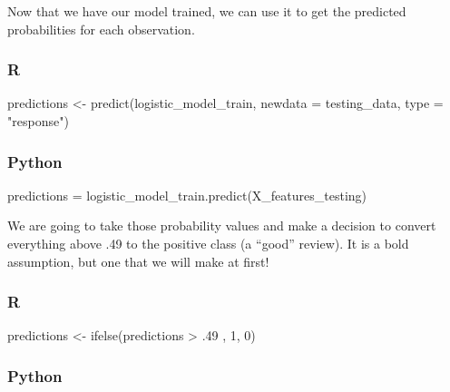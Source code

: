 \documentclass[
  letterpaper,
]{krantz}
\newenvironment{Shaded}{}{}
\newcommand{\AttributeTok}[1]{\textcolor[rgb]{0.49,0.56,0.16}{#1}}
\newcommand{\DecValTok}[1]{\textcolor[rgb]{0.25,0.63,0.44}{#1}}
\newcommand{\FunctionTok}[1]{\textcolor[rgb]{0.02,0.16,0.49}{#1}}
\newcommand{\NormalTok}[1]{#1}
\newcommand{\OperatorTok}[1]{\textcolor[rgb]{0.40,0.40,0.40}{#1}}
\newcommand{\OtherTok}[1]{\textcolor[rgb]{0.00,0.44,0.13}{#1}}
\newcommand{\SpecialCharTok}[1]{\textcolor[rgb]{0.25,0.44,0.63}{#1}}
\newcommand{\StringTok}[1]{\textcolor[rgb]{0.25,0.44,0.63}{#1}}
\begin{document}
Now that we have our model trained, we can use it to get the predicted
probabilities for each observation.

\subsubsection{R}

\begin{Shaded}
\begin{Highlighting}[]
\NormalTok{predictions }\OtherTok{\textless{}{-}} \FunctionTok{predict}\NormalTok{(logistic\_model\_train, }
                       \AttributeTok{newdata =}\NormalTok{ testing\_data, }
                       \AttributeTok{type =} \StringTok{"response"}\NormalTok{)}
\end{Highlighting}
\end{Shaded}

\subsubsection{Python}

\begin{Shaded}
\begin{Highlighting}[]
\NormalTok{predictions }\OperatorTok{=}\NormalTok{ logistic\_model\_train.predict(X\_features\_testing)}
\end{Highlighting}
\end{Shaded}

We are going to take those probability values and make a decision to
convert everything above .49 to the positive class (a ``good'' review).
It is a bold assumption, but one that we will make at first!

\subsubsection{R}

\begin{Shaded}
\begin{Highlighting}[]
\NormalTok{predictions }\OtherTok{\textless{}{-}} \FunctionTok{ifelse}\NormalTok{(predictions }\SpecialCharTok{\textgreater{}}\NormalTok{ .}\DecValTok{49}\NormalTok{ , }\DecValTok{1}\NormalTok{, }\DecValTok{0}\NormalTok{)}
\end{Highlighting}
\end{Shaded}

\subsubsection{Python}
\end{document}
